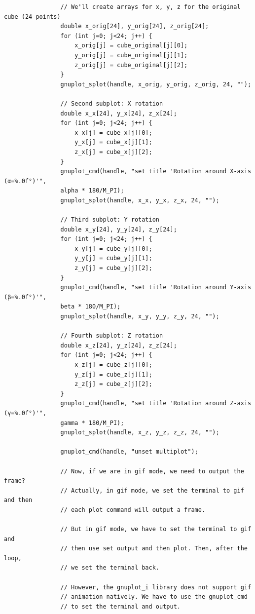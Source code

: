\documentclass[a4paper,10pt]{article}
\begin{document}
\begin{verbatim}
                // We'll create arrays for x, y, z for the original cube (24 points)
                double x_orig[24], y_orig[24], z_orig[24];
                for (int j=0; j<24; j++) {
                    x_orig[j] = cube_original[j][0];
                    y_orig[j] = cube_original[j][1];
                    z_orig[j] = cube_original[j][2];
                }
                gnuplot_splot(handle, x_orig, y_orig, z_orig, 24, "");

                // Second subplot: X rotation
                double x_x[24], y_x[24], z_x[24];
                for (int j=0; j<24; j++) {
                    x_x[j] = cube_x[j][0];
                    y_x[j] = cube_x[j][1];
                    z_x[j] = cube_x[j][2];
                }
                gnuplot_cmd(handle, "set title 'Rotation around X-axis (α=%.0f°)'",
                alpha * 180/M_PI);
                gnuplot_splot(handle, x_x, y_x, z_x, 24, "");

                // Third subplot: Y rotation
                double x_y[24], y_y[24], z_y[24];
                for (int j=0; j<24; j++) {
                    x_y[j] = cube_y[j][0];
                    y_y[j] = cube_y[j][1];
                    z_y[j] = cube_y[j][2];
                }
                gnuplot_cmd(handle, "set title 'Rotation around Y-axis (β=%.0f°)'",
                beta * 180/M_PI);
                gnuplot_splot(handle, x_y, y_y, z_y, 24, "");

                // Fourth subplot: Z rotation
                double x_z[24], y_z[24], z_z[24];
                for (int j=0; j<24; j++) {
                    x_z[j] = cube_z[j][0];
                    y_z[j] = cube_z[j][1];
                    z_z[j] = cube_z[j][2];
                }
                gnuplot_cmd(handle, "set title 'Rotation around Z-axis (γ=%.0f°)'",
                gamma * 180/M_PI);
                gnuplot_splot(handle, x_z, y_z, z_z, 24, "");

                gnuplot_cmd(handle, "unset multiplot");

                // Now, if we are in gif mode, we need to output the frame?
                // Actually, in gif mode, we set the terminal to gif and then
                // each plot command will output a frame.

                // But in gif mode, we have to set the terminal to gif and
                // then use set output and then plot. Then, after the loop,
                // we set the terminal back.

                // However, the gnuplot_i library does not support gif
                // animation natively. We have to use the gnuplot_cmd
                // to set the terminal and output.


\end{verbatim}
\end{document}
